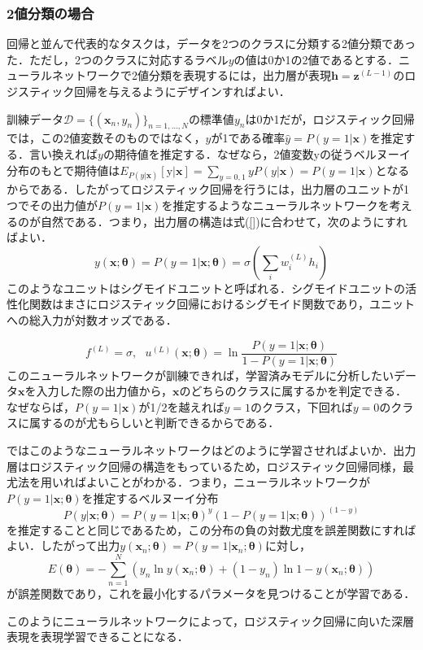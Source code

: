 \documentclass[a4paper,11pt]{jsreport}
\begin{document}
\subsubsection*{2値分類の場合}
回帰と並んで代表的なタスクは，データを2つのクラスに分類する2値分類であった．ただし，2つのクラスに対応するラベル$y$の値は0か1の2値であるとする．ニューラルネットワークで2値分類を表現するには，出力層が表現$\bm{h} = \bm{z}^{(L-1)}$のロジスティック回帰を与えるようにデザインすればよい．\par
訓練データ$\mathcal{D} = \{ (\bm{x}_n, y_n) \}_{n=1,\dots ,N}$の標準値$y_n$は0か1だが，ロジスティック回帰では，この2値変数そのものではなく，$y$が1である確率$\hat{y} = P(y=1 | \bm{x})$を推定する．言い換えれば$y$の期待値を推定する．なぜなら，2値変数$\mathrm{y}$の従うベルヌーイ分布のもとで期待値は$E_{P(y | \bm{x})}[\mathrm{y} | \bm{x}] = \sum_{y=0,1} y P(y | \bm{x}) = P(y=1 | \bm{x})$となるからである．したがってロジスティック回帰を行うには，出力層のユニットが1つでその出力値が$P(y=1 | \bm{x})$を推定するようなニューラルネットワークを考えるのが自然である．つまり，出力層の構造は式(\ref{})に合わせて，次のようにすればよい．
\begin{equation}
  y(\bm{x}; \bm{\theta})
  = P(y=1 | \bm{x}; \bm{\theta})
  = \sigma\left( \sum_i w_i^{(L)} h_i \right)
\end{equation}
このようなユニットはシグモイドユニットと呼ばれる．シグモイドユニットの活性化関数はまさにロジスティック回帰におけるシグモイド関数であり，ユニットへの総入力が対数オッズである．\par
\begin{equation}
  f^{(L)} = \sigma, \ \ \
  u^{(L)}(\bm{x}; \bm{\theta}) = \ln{\frac{P(y=1 | \bm{x}; \bm{\theta})}{1 - P(y=1 | \bm{x}; \bm{\theta})}}
\end{equation}
このニューラルネットワークが訓練できれば，学習済みモデルに分析したいデータ$\bm{x}$を入力した際の出力値から，$\bm{x}$のどちらのクラスに属するかを判定できる．なぜならば，$P(y=1 | \bm{x})$が1/2を越えれば$y=1$のクラス，下回れば$y=0$のクラスに属するのが尤もらしいと判断できるからである．\par
ではこのようなニューラルネットワークはどのように学習させればよいか．出力層はロジスティック回帰の構造をもっているため，ロジスティック回帰同様，最尤法を用いればよいことがわかる．つまり，ニューラルネットワークが$P(y=1 | \bm{x};\bm{\theta})$を推定するベルヌーイ分布
\begin{equation}
  P(y | \bm{x}; \bm{\theta})
  = P(y = 1 | \bm{x}; \bm{\theta})^y (1 - P(y = 1 | \bm{x}; \bm{\theta}))^{(1-y)}
\end{equation}
を推定することと同じであるため，この分布の負の対数尤度を誤差関数にすればよい．したがって出力$y(\bm{x}_n; \bm{\theta}) = P(y=1 | \bm{x}_n; \bm{\theta})$に対し，
\begin{equation}
  E(\bm{\theta})
  = -\sum_{n=1}^N \left( y_n \ln{y(\bm{x}_n; \bm{\theta})}
  + (1 - y_n) \ln{1 - y(\bm{x}_n; \bm{\theta})} \right)
\end{equation}
が誤差関数であり，これを最小化するパラメータを見つけることが学習である．\par
このようにニューラルネットワークによって，ロジスティック回帰に向いた深層表現を表現学習できることになる．
\end{document}
